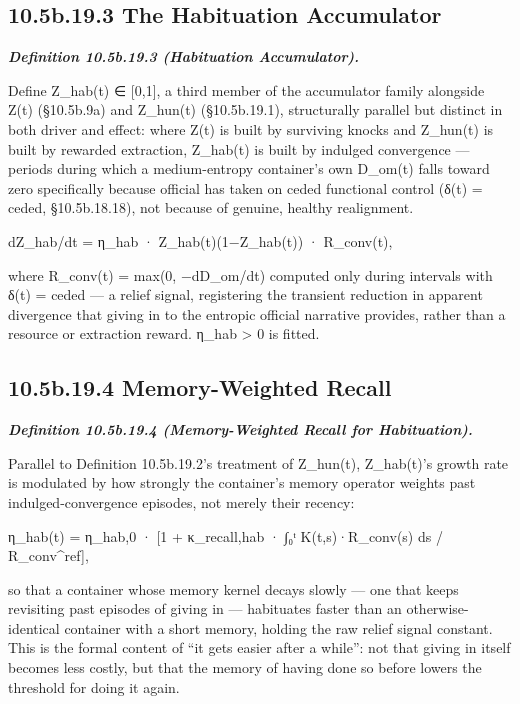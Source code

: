 \documentclass[
]{article}
\begin{document}
\hypertarget{b.19.3-the-habituation-accumulator}{%
\subsection{10.5b.19.3 The Habituation
Accumulator}\label{b.19.3-the-habituation-accumulator}}

\emph{\textbf{Definition 10.5b.19.3 (Habituation Accumulator).}}

Define Z\_hab(t) ∈ {[}0,1{]}, a third member of the accumulator family
alongside Z(t) (§10.5b.9a) and Z\_hun(t) (§10.5b.19.1), structurally
parallel but distinct in both driver and effect: where Z(t) is built by
surviving knocks and Z\_hun(t) is built by rewarded extraction,
Z\_hab(t) is built by indulged convergence --- periods during which a
medium-entropy container's own D\_om(t) falls toward zero specifically
because official has taken on ceded functional control (δ(t) = ceded,
§10.5b.18.18), not because of genuine, healthy realignment.

dZ\_hab/dt = η\_hab · Z\_hab(t)(1−Z\_hab(t)) · R\_conv(t),

where R\_conv(t) = max(0, −dD\_om/dt) computed only during intervals
with δ(t) = ceded --- a relief signal, registering the transient
reduction in apparent divergence that giving in to the entropic official
narrative provides, rather than a resource or extraction reward. η\_hab
\textgreater{} 0 is fitted.

\hypertarget{b.19.4-memory-weighted-recall}{%
\subsection{10.5b.19.4 Memory-Weighted
Recall}\label{b.19.4-memory-weighted-recall}}

\emph{\textbf{Definition 10.5b.19.4 (Memory-Weighted Recall for
Habituation).}}

Parallel to Definition 10.5b.19.2's treatment of Z\_hun(t), Z\_hab(t)'s
growth rate is modulated by how strongly the container's memory operator
weights past indulged-convergence episodes, not merely their recency:

η\_hab(t) = η\_hab,0 · {[}1 + κ\_recall,hab · ∫₀ᵗ K(t,s)·R\_conv(s) ds /
R\_conv\^{}ref{]},

so that a container whose memory kernel decays slowly --- one that keeps
revisiting past episodes of giving in --- habituates faster than an
otherwise-identical container with a short memory, holding the raw
relief signal constant. This is the formal content of ``it gets easier
after a while'': not that giving in itself becomes less costly, but that
the memory of having done so before lowers the threshold for doing it
again.
\end{document}
